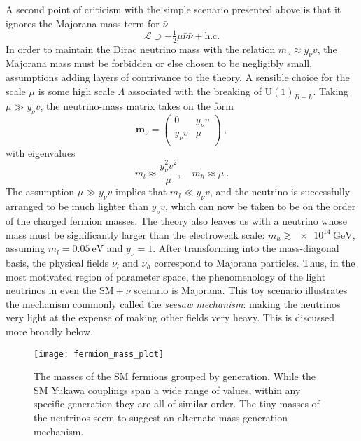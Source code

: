 A second point of criticism with the simple scenario presented above is that it
ignores the Majorana mass term for $\bar{\nu}$
\begin{equation}
  \mathscr{L} \supset - \tfrac{1}{2} \mu \bar{\nu} \bar{\nu} + \text{h.c.}
\end{equation}
In order to maintain the Dirac neutrino mass with the relation
$m_{\nu} \approx y_{\nu}v$, the Majorana mass must be forbidden or else chosen
to be negligibly small, assumptions adding layers of contrivance to the theory.
A sensible choice for the scale $\mu$ is some high scale $\Lambda$ associated
with the breaking of $\mathrm{U}(1)_{B-L}$. Taking $\mu \gg y_{\nu} v$, the
neutrino-mass matrix takes on the form
\begin{equation}
  \mathbf{m}_{\nu} = \begin{pmatrix}
    0 & y_{\nu} v \\
    y_{\nu} v & \mu \\
  \end{pmatrix} \ ,
\end{equation}
with eigenvalues
\begin{equation}
  m_{l} \approx \frac{y_{\nu}^{2}v^{2}}{\mu},\quad m_{h} \approx \mu \ .
\end{equation}
The assumption $\mu \gg y_{\nu} v$ implies that $m_{l} \ll y_{\nu} v$, and the
neutrino is successfully arranged to be much lighter than $y_{\nu} v$, which can
now be taken to be on the order of the charged fermion masses. The theory also
leaves us with a neutrino whose mass must be significantly larger than the
electroweak scale: $m_{h} \gtrsim \SI{e14}{\GeV}$, assuming
$m_{l} = \SI{0.05}{\eV}$ and $y_{\nu} = 1$. After transforming into the
mass-diagonal basis, the physical fields $\nu_{l}$ and $\nu_{h}$ correspond to
Majorana particles. Thus, in the most motivated region of parameter space, the
phenomenology of the light neutrinos in even the $\text{SM} + \bar{\nu}$
scenario is Majorana. This toy scenario illustrates the mechanism commonly
called the \textit{seesaw mechanism}: making the neutrinos very light at the
expense of making other fields very heavy. This is discussed more broadly below.

\begin{figure}[t]
  \centering
  \texttt{[image: fermion\_mass\_plot]}
  \caption[The masses of the SM fermions grouped by generation.]{The masses of
    the SM fermions grouped by generation. While the SM Yukawa couplings span a
    wide range of values, within any specific generation they are all of similar
    order. The tiny masses of the neutrinos seem to suggest an alternate
    mass-generation mechanism.}
  \label{fig:ch1-fermion-masses}
\end{figure}

